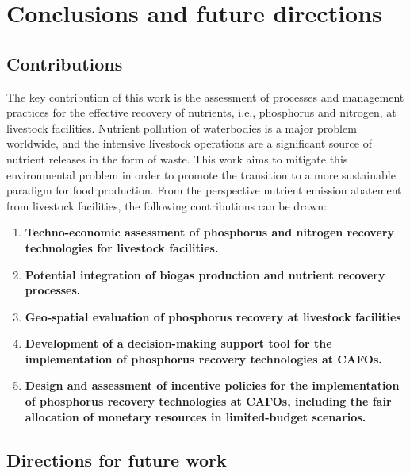 \chapter{Conclusions and future directions}\label{ch:NitrogenTechs}

\section{Contributions}
The key contribution of this work is the assessment of processes and management practices for the effective recovery of nutrients, i.e., phosphorus and nitrogen, at livestock facilities. Nutrient pollution of waterbodies is a major problem worldwide, and the intensive livestock operations are a significant source of nutrient releases in the form of waste. This work aims to mitigate this environmental problem in order to promote the transition to a more sustainable paradigm for food production. From the perspective nutrient emission abatement from livestock facilities, the following contributions can be drawn:

\begin{enumerate}[font=\bfseries]
	\item \textbf{Techno-economic assessment of phosphorus and nitrogen recovery technologies for livestock facilities.}
	\item \textbf{Potential integration of biogas production and nutrient recovery processes.}
	\item \textbf{Geo-spatial evaluation of phosphorus recovery at livestock facilities}
	\item \textbf{Development of a decision-making support tool for the implementation of phosphorus recovery technologies at CAFOs.}
	\item \textbf{Design and assessment of incentive policies for the implementation of phosphorus recovery technologies at CAFOs, including the fair allocation of monetary resources in limited-budget scenarios.}
\end{enumerate}







\section{Directions for future work}
